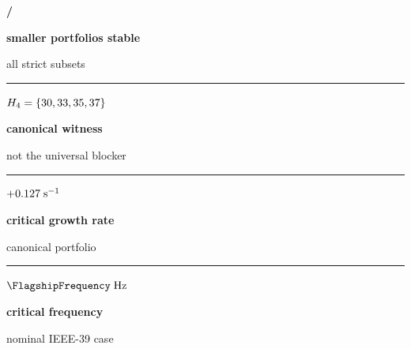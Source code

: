 \documentclass[final]{beamer}
\newcommand{\MetricCell}[3]{%
  \begin{minipage}[c][40mm][c]{\linewidth}\centering
    {\PosterCondensed\bfseries\fontsize{40pt}{42pt}\selectfont\color{IASGold}#1\par}
    {\bfseries\fontsize{27pt}{30pt}\selectfont\color{white}#2\par}
    {\fontsize{24.2pt}{26.2pt}\selectfont\color{IASPaleGreen}#3\par}
  \end{minipage}%
}
\begin{document}
\begin{frame}[t]
\noindent\hspace*{6mm}%
\colorbox{IASDeepGreen}{\begin{minipage}[c][44mm][c]{902mm}
  \noindent\begin{minipage}[c]{224mm}\MetricCell{\NumProperStable/\NumProperTotal}{smaller portfolios stable}{all strict subsets}\end{minipage}%
  \begin{minipage}[c]{2mm}\centering\textcolor{IASPaleGreen}{\rule{0.7pt}{30mm}}\end{minipage}%
  \begin{minipage}[c]{224mm}\MetricCell{$H_4=\{ 30, 33, 35, 37 \}$}{canonical witness}{not the universal blocker}\end{minipage}%
  \begin{minipage}[c]{2mm}\centering\textcolor{IASPaleGreen}{\rule{0.7pt}{30mm}}\end{minipage}%
  \begin{minipage}[c]{224mm}\MetricCell{$+0.127\;\mathrm{s}^{-1}$}{critical growth rate}{canonical portfolio}\end{minipage}%
  \begin{minipage}[c]{2mm}\centering\textcolor{IASPaleGreen}{\rule{0.7pt}{30mm}}\end{minipage}%
  \begin{minipage}[c]{224mm}\MetricCell{$\FlagshipFrequency\;\mathrm{Hz}$}{critical frequency}{nominal IEEE-39 case}\end{minipage}
\end{minipage}}\par
\vspace{3mm}


\end{frame}
\end{document}
